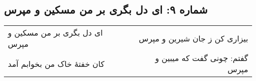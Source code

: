\begin{center}
\section*{شماره ۹: ای دل بگری بر من مسکین و مپرس}
\label{sec:009}
\begin{longtable}{l p{0.5cm} r}
ای دل بگری بر من مسکین و مپرس
&&
بیزاری کن ز جان شیرین و مپرس
\\
کان خفتهٔ خاک من بخوابم آمد
&&
گفتم: چونی گفت که میبین و مپرس
\\
\end{longtable}
\end{center}
